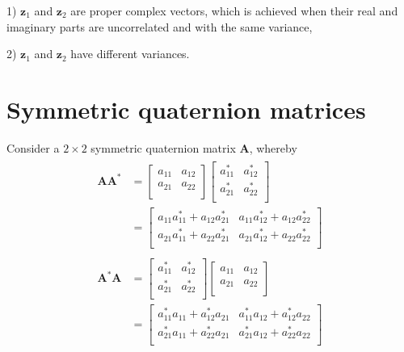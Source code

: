 \documentclass[review]{elsarticle}
\theoremstyle{plain}
\theoremstyle{remark}
\theoremstyle{plain}
\theoremstyle{definition}
\theoremstyle{prop}
\theoremstyle{definition}
\theoremstyle{plain}
\theoremstyle{plain}
\begin{document}
\begin{appendices}
1) $\mathbf{z}_1$ and $\mathbf{z}_2$ are proper complex vectors, which is achieved when their real and imaginary parts are uncorrelated and with the same
variance,
 
2) $\mathbf{z}_1$ and $\mathbf{z}_2$ have different variances.
\section{Symmetric quaternion matrices}
Consider a $2 \times 2$ symmetric quaternion matrix $\mathbf{A}$, whereby \newline
\vspace{-2mm}\begin{align*}
\begin{split}
\mathbf{A}\mathbf{A}^*&=\begin{bmatrix}
a_{11} & a_{12} \\
a_{21} & a_{22} \\
\end{bmatrix} \begin{bmatrix}
a_{11}^* & a_{12}^* \\
a_{21}^* & a_{22}^* \\
\end{bmatrix} \\
&=\begin{bmatrix}
a_{11}a_{11}^*+a_{12}a_{21}^* & a_{11}a_{12}^*+a_{12}a_{22}^* \\
a_{21}a_{11}^*+a_{22}a_{21}^* & a_{21}a_{12}^*+a_{22}a_{22}^* \\
\end{bmatrix}
\end{split}
\end{align*}
\begin{align*}
\begin{split}
\mathbf{A}^*\mathbf{A}&=\begin{bmatrix}
a_{11}^* & a_{12}^* \\
a_{21}^* & a_{22}^* \\
\end{bmatrix} \begin{bmatrix}
a_{11} & a_{12} \\
a_{21} & a_{22} \\
\end{bmatrix} \\
&=\begin{bmatrix}
a_{11}^*a_{11}+a_{12}^*a_{21} & a_{11}^*a_{12}+a_{12}^*a_{22} \\
a_{21}^*a_{11}+a_{22}^*a_{21} & a_{21}^*a_{12}+a_{22}^*a_{22} \\

\end{bmatrix}
\end{split}
\end{align*}
\end{appendices}
\end{document}
